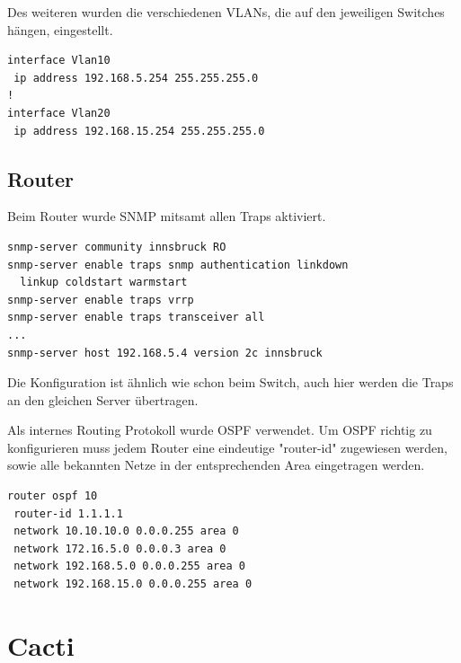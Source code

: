 Des weiteren wurden die verschiedenen \ac{VLAN}s, die auf den jeweiligen Switches hängen, eingestellt.

\begin{lstlisting}[caption={VLAN Konfiguration auf Switch 1},label={lst:vlan},language={}]
interface Vlan10
 ip address 192.168.5.254 255.255.255.0
!
interface Vlan20
 ip address 192.168.15.254 255.255.255.0

\end{lstlisting}


\section{Router}

Beim Router wurde \ac{SNMP} mitsamt allen Traps aktiviert.

\begin{lstlisting}[caption={SNMP-Config Router},label={lst:router},language={}]
snmp-server community innsbruck RO
snmp-server enable traps snmp authentication linkdown 
  linkup coldstart warmstart
snmp-server enable traps vrrp
snmp-server enable traps transceiver all
...
snmp-server host 192.168.5.4 version 2c innsbruck
\end{lstlisting}

Die Konfiguration ist ähnlich wie schon beim Switch, auch hier werden die Traps an den gleichen Server übertragen.


Als internes Routing Protokoll wurde \ac{OSPF} verwendet. Um \ac{OSPF} richtig zu konfigurieren muss jedem Router eine eindeutige "router-id" zugewiesen werden, sowie alle bekannten Netze in der entsprechenden Area eingetragen werden.

\begin{lstlisting}[caption={OSPF Konfiguration auf Router 1},label={lst:ospf},language={}]
router ospf 10
 router-id 1.1.1.1
 network 10.10.10.0 0.0.0.255 area 0
 network 172.16.5.0 0.0.0.3 area 0
 network 192.168.5.0 0.0.0.255 area 0
 network 192.168.15.0 0.0.0.255 area 0 
\end{lstlisting}




\chapter{Cacti}
\label{cacti}

